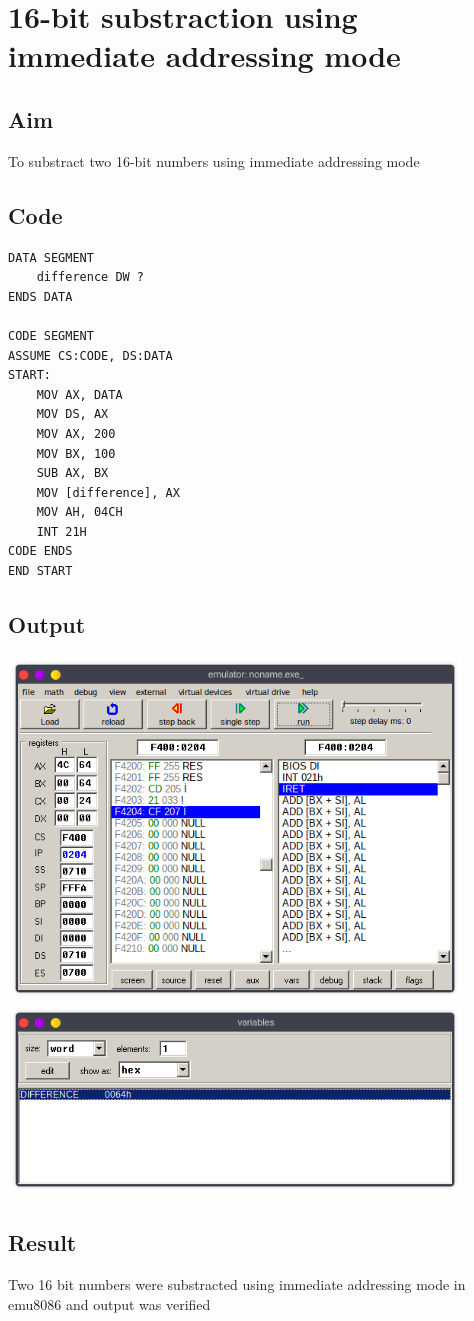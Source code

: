 \section{16-bit substraction using immediate addressing mode}
\subsection{Aim}
To substract two 16-bit numbers using immediate addressing mode

\subsection{Code}
\begin{lstlisting}
DATA SEGMENT
	difference DW ?
ENDS DATA

CODE SEGMENT
ASSUME CS:CODE, DS:DATA
START:
    MOV AX, DATA
    MOV DS, AX
    MOV AX, 200
    MOV BX, 100
    SUB AX, BX
	MOV [difference], AX
    MOV AH, 04CH
    INT 21H
CODE ENDS
END START
\end{lstlisting}

\subsection{Output}
\begin{center}
	\includegraphics[width=0.90\textwidth]{img/p2/ss1.png}
	\includegraphics[width=0.90\textwidth]{img/p2/ss2.png}
\end{center}

\subsection{Result}
Two 16 bit numbers were substracted using immediate addressing mode in emu8086 and output was verified